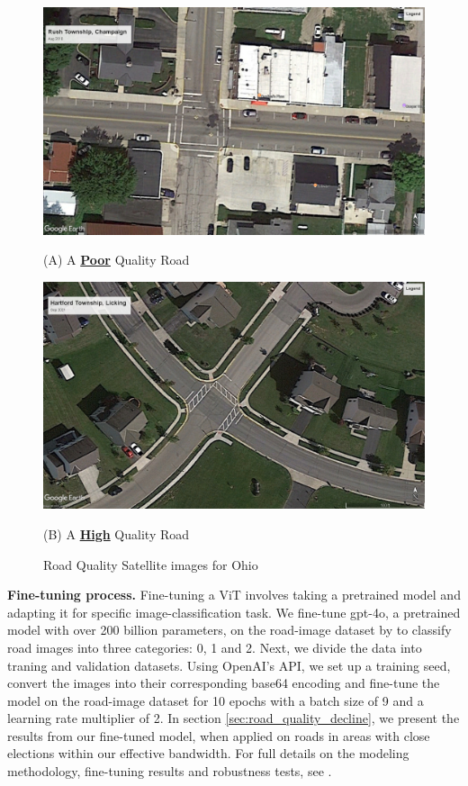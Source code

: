\begin{figure}[ht]
    \centering
    \begin{minipage}{0.49\textwidth}
        \centering
        \includegraphics[width=\textwidth]{images/rush_twp_champaign_aug16.jpg}
        \caption*{(A) A {\bf \underline{Poor}} Quality Road}
    \end{minipage}\hfill
    \begin{minipage}{0.49\textwidth}
        \centering
        \includegraphics[width=\textwidth]{images/hartford_twp_licking_sep21.jpg}
        \caption*{(B) A {\bf \underline{High}} Quality Road}
    \end{minipage}
    \caption{Road Quality Satellite images for Ohio}
    \label{fig:road_quality_examples}
\end{figure}


{\bf Fine-tuning process.} Fine-tuning a ViT involves taking a pretrained model and adapting it for specific image-classification task. We fine-tune gpt-4o, a pretrained model with over 200 billion parameters, on the road-image dataset by \cite{brewer2021} to classify road images into three categories: 0, 1 and 2. Next, we divide the data into traning and validation datasets. Using OpenAI's API, we set up a training seed, convert the images into their corresponding base64 encoding and fine-tune the model on the road-image dataset for 10 epochs with a batch size of 9 and a learning rate multiplier of 2. In section \ref{sec:road_quality_decline}, we present the results from our fine-tuned model, when applied on roads in areas with close elections within our effective bandwidth. For full details on the modeling methodology, fine-tuning results and robustness tests, see \cite{2025predicting}. 

